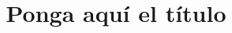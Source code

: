 \documentclass[a4paper, 11pt]{article}
\title{Ponga aquí el título}
\begin{document}
\begin{center}
\end{center}
\end{document}
